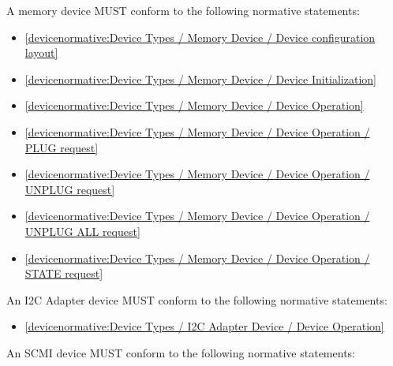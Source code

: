 \label{sec:Conformance / Device Conformance / Memory Device Conformance}

A memory device MUST conform to the following normative statements:

\begin{itemize}
\item \ref{devicenormative:Device Types / Memory Device / Device configuration layout}
\item \ref{devicenormative:Device Types / Memory Device / Device Initialization}
\item \ref{devicenormative:Device Types / Memory Device / Device Operation}
\item \ref{devicenormative:Device Types / Memory Device / Device Operation / PLUG request}
\item \ref{devicenormative:Device Types / Memory Device / Device Operation / UNPLUG request}
\item \ref{devicenormative:Device Types / Memory Device / Device Operation / UNPLUG ALL request}
\item \ref{devicenormative:Device Types / Memory Device / Device Operation / STATE request}
\end{itemize}

\label{sec:Conformance / Device Conformance / I2C Adapter Device Conformance}

An I2C Adapter device MUST conform to the following normative statements:

\begin{itemize}
\item \ref{devicenormative:Device Types / I2C Adapter Device / Device Operation}
\end{itemize}

\label{sec:Conformance / Device Conformance / SCMI Device Conformance}

An SCMI device MUST conform to the following normative statements:

